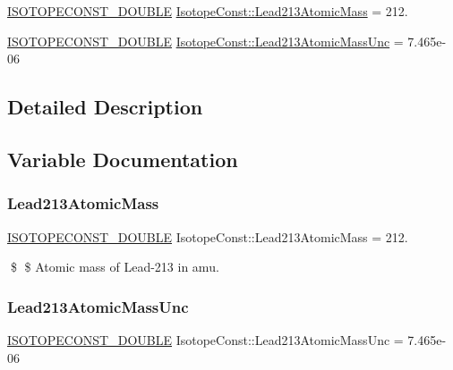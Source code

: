 \begin{DoxyCompactItemize}
\item 
\mbox{\hyperlink{group___isotope_const-_macros_ga8f45a7272ce02c0b4c65c44636ed719a}{I\+S\+O\+T\+O\+P\+E\+C\+O\+N\+S\+T\+\_\+\+D\+O\+U\+B\+LE}} \mbox{\hyperlink{group___isotope_const-_lead-_pb213_ga734f9e1c8c51acb164ca760a67612e62}{Isotope\+Const\+::\+Lead213\+Atomic\+Mass}} = 212.
\item 
\mbox{\hyperlink{group___isotope_const-_macros_ga8f45a7272ce02c0b4c65c44636ed719a}{I\+S\+O\+T\+O\+P\+E\+C\+O\+N\+S\+T\+\_\+\+D\+O\+U\+B\+LE}} \mbox{\hyperlink{group___isotope_const-_lead-_pb213_ga16a4803735fdb9eb157f7bfb44e0ad76}{Isotope\+Const\+::\+Lead213\+Atomic\+Mass\+Unc}} = 7.\+465e-\/06
\end{DoxyCompactItemize}


\subsection{Detailed Description}


\subsection{Variable Documentation}
\mbox{\label{group___isotope_const-_lead-_pb213_ga734f9e1c8c51acb164ca760a67612e62}} 
\subsubsection{\texorpdfstring{Lead213\+Atomic\+Mass}{Lead213AtomicMass}}
{\footnotesize\ttfamily \mbox{\hyperlink{group___isotope_const-_macros_ga8f45a7272ce02c0b4c65c44636ed719a}{I\+S\+O\+T\+O\+P\+E\+C\+O\+N\+S\+T\+\_\+\+D\+O\+U\+B\+LE}} Isotope\+Const\+::\+Lead213\+Atomic\+Mass = 212.}

\$ \$ Atomic mass of Lead-\/213 in amu. \mbox{\label{group___isotope_const-_lead-_pb213_ga16a4803735fdb9eb157f7bfb44e0ad76}} 
\subsubsection{\texorpdfstring{Lead213\+Atomic\+Mass\+Unc}{Lead213AtomicMassUnc}}
{\footnotesize\ttfamily \mbox{\hyperlink{group___isotope_const-_macros_ga8f45a7272ce02c0b4c65c44636ed719a}{I\+S\+O\+T\+O\+P\+E\+C\+O\+N\+S\+T\+\_\+\+D\+O\+U\+B\+LE}} Isotope\+Const\+::\+Lead213\+Atomic\+Mass\+Unc = 7.\+465e-\/06}

